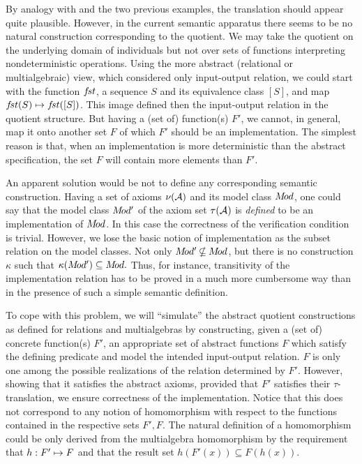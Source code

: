 By analogy with  and the two previous examples, the translation
 should appear quite plausible. However, in the current 
semantic apparatus there seems to be no natural construction corresponding to the quotient. We may take the quotient on the underlying domain of individuals but
not over sets of functions interpreting nondeterministic operations. Using the more abstract (relational or multialgebraic) view, which considered only input-output relation, we could start with the function $f\!st$, a sequence
$S$ and its equivalence class $[S]$, and map $f\!st(S)\mathrel{\mapsto} f\!st([S])$. This image defined then the input-output relation in the quotient structure. But having a (set of) function(s) $F'$, we cannot, in general, map it onto another set $F$ of which $F'$ should be an implementation. The simplest reason is that,
when an implementation is more deterministic than the abstract specification, the set $F$ will contain more elements than $F'$. 

An apparent solution would be not to define any corresponding semantic construction. Having a set of axioms $\nu({\cal A})$ and its model class $M\!od$, one
could say that the model class $M\!od'$ of the axiom set $\tau({\cal A})$ is {\em defined}
to be an implementation of $M\!od$. In this case the correctness of the verification condition is trivial. However, we lose the basic notion of implementation as the subset relation on the model classes. Not only $\Mod'\Not\subseteq \Mod$, but there is no construction $\kappa$ such that $\kappa(M\!od')\subseteq M\!od.$ Thus, for instance, transitivity of the implementation relation has to be proved in a much more cumbersome way than in the presence of such a simple semantic definition. 

To cope with this problem, we will ``simulate'' the abstract quotient constructions as defined for relations and multialgebras by constructing, given a (set of) concrete function(s) $F'$, an appropriate set of abstract functions $F$
which satisfy the defining predicate and model the intended input-output relation.
$F$ is only one among the possible realizations of the relation determined by $F'$. However, showing that it satisfies the abstract axioms, provided that $F'$ satisfies their $\tau$-translation, we ensure correctness of the implementation. Notice that this does not correspond to any notion of homomorphism with respect to the functions contained in the respective sets $F',F.$
The natural definition of a homomorphism could be only derived from the multialgebra homomorphism by the requirement that $h:F'\mathrel{\mapsto} F$ and that the result set $h(F'(x))\subseteq F(h(x)).$

